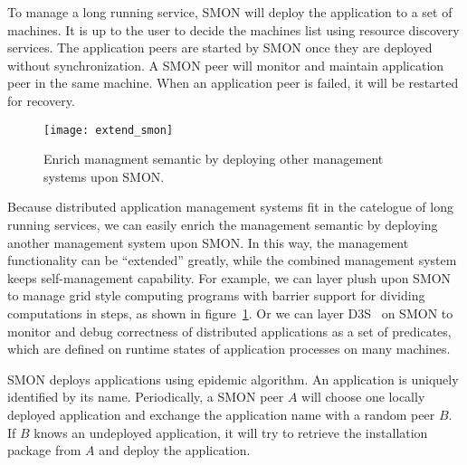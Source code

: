 To manage a long running service, SMON will deploy the
application to a set of machines. It is up to the user to
decide the machines list using resource discovery services.
The application peers are started by SMON once they are
deployed without synchronization. A SMON peer will monitor
and maintain application peer in the same machine. When an
application peer is failed, it will be restarted for
recovery.

\begin{figure}
\centering
\texttt{[image: extend\_smon]}
\caption{Enrich managment semantic by deploying other
management systems upon SMON.}
\label{fig:extend_smon}
\end{figure}

Because distributed application management systems fit in
the catelogue of long running services, we can easily enrich
the management semantic by deploying another management
system upon SMON. In this way, the management functionality
can be ``extended'' greatly, while the combined management
system keeps self-management capability. For example, we can
layer plush upon SMON to manage grid style computing
programs with barrier support for dividing computations in
steps, as shown in figure~\ref{fig:extend_smon}. Or we can
layer D3S~\cite{d3s} on SMON to monitor and debug
correctness of distributed applications as a set of
predicates, which are defined on runtime states of
application processes on many machines.


SMON deploys applications using epidemic algorithm.  An
application is uniquely identified by its name.
Periodically, a SMON peer $A$ will choose one locally
deployed application and exchange the application name with
a random peer $B$. If $B$ knows an undeployed application,
it will try to retrieve the installation package from $A$
and deploy the application.

